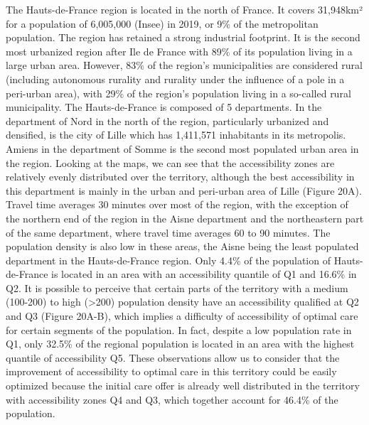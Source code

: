 The Hauts-de-France region is located in the north of France. It covers
31,948km² for a population of 6,005,000 (Insee) in 2019, or 9\% of the
metropolitan population. The region has retained a strong industrial footprint.
It is the second most urbanized region after Ile de France with 89\% of its
population living in a large urban area. However, 83\% of the region's
municipalities are considered rural (including autonomous rurality and rurality
under the influence of a pole in a peri-urban area), with 29\% of the region's
population living in a so-called rural municipality. The Hauts-de-France is
composed of 5 departments. In the department of Nord in the north of the region,
particularly urbanized and densified, is the city of Lille which has 1,411,571
inhabitants in its metropolis. Amiens in the department of Somme is the second
most populated urban area in the region. Looking at the maps, we can see that
the accessibility zones are relatively evenly distributed over the territory,
although the best accessibility in this department is mainly in the urban and
peri-urban area of Lille (Figure 20A). Travel time averages 30 minutes over most
of the region, with the exception of the northern end of the region in the Aisne
department and the northeastern part of the same department, where travel time
averages 60 to 90 minutes. The population density is also low in these areas,
the Aisne being the least populated department in the Hauts-de-France region.
Only 4.4\% of the population of Hauts-de-France is located in an area with an
accessibility quantile of Q1 and 16.6\% in Q2. It is possible to perceive that
certain parts of the territory with a medium (100-200) to high (>200) population
density have an accessibility qualified at Q2 and Q3 (Figure 20A-B), which
implies a difficulty of accessibility of optimal care for certain segments of
the population. In fact, despite a low population rate in Q1, only 32.5\% of the
regional population is located in an area with the highest quantile of
accessibility Q5. These observations allow us to consider that the improvement
of accessibility to optimal care in this territory could be easily optimized
because the initial care offer is already well distributed in the territory with
accessibility zones Q4 and Q3, which together account for 46.4\% of the
population.

